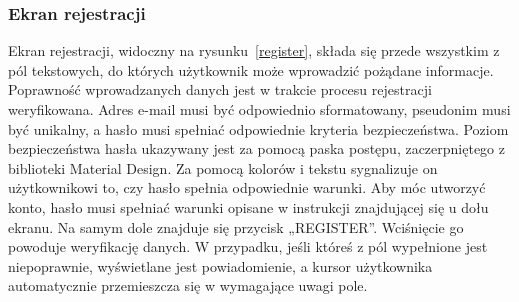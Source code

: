         \subsubsection{Ekran rejestracji}
        Ekran rejestracji, widoczny na rysunku~\ref{register}, składa się przede wszystkim z pól tekstowych, do których użytkownik może wprowadzić pożądane informacje. Poprawność wprowadzanych danych jest
        w trakcie procesu rejestracji weryfikowana. Adres e-mail musi być odpowiednio sformatowany, pseudonim musi być unikalny, a hasło musi spełniać odpowiednie kryteria bezpieczeństwa. Poziom bezpieczeństwa
        hasła ukazywany jest za pomocą paska postępu, zaczerpniętego z biblioteki Material Design. Za pomocą kolorów i tekstu sygnalizuje on użytkownikowi to, czy hasło spełnia odpowiednie warunki. Aby móc
        utworzyć konto, hasło musi spełniać warunki opisane w instrukcji znajdującej się u dołu ekranu. Na samym dole znajduje się przycisk „REGISTER”. Wciśnięcie go powoduje weryfikację danych. W przypadku,
        jeśli któreś z pól wypełnione jest niepoprawnie, wyświetlane jest powiadomienie, a kursor użytkownika automatycznie przemieszcza się w wymagające uwagi pole.

